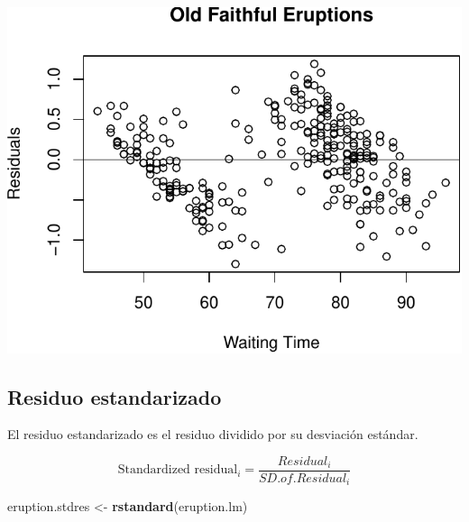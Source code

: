 \documentclass[]{article}
\newenvironment{Shaded}{\begin{snugshade}}{\end{snugshade}}
\newcommand{\KeywordTok}[1]{\textcolor[rgb]{0.13,0.29,0.53}{\textbf{{#1}}}}
\newcommand{\DataTypeTok}[1]{\textcolor[rgb]{0.13,0.29,0.53}{{#1}}}
\newcommand{\DecValTok}[1]{\textcolor[rgb]{0.00,0.00,0.81}{{#1}}}
\newcommand{\StringTok}[1]{\textcolor[rgb]{0.31,0.60,0.02}{{#1}}}
\newcommand{\NormalTok}[1]{{#1}}
\numberwithin{equation}{section}
\begin{document}
\includegraphics{tema6_files/figure-latex/unnamed-chunk-24-1.pdf}

\subsection{Residuo estandarizado}\label{residuo-estandarizado}

El residuo estandarizado es el residuo dividido por su desviación
estándar.

\[
\mbox{Standardized residual}_i =  \frac{Residual_i}{SD.of.Residual_i}
\]

\begin{Shaded}
\begin{Highlighting}[]
\NormalTok{eruption.stdres <-}\StringTok{ }\KeywordTok{rstandard}\NormalTok{(eruption.lm) }
\end{Highlighting}
\end{Shaded}

\begin{Shaded}
\end{Shaded}
\end{document}
